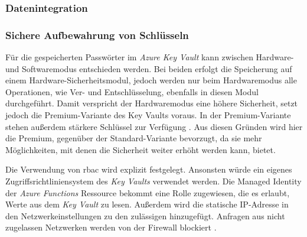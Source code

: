 \subsubsection{Datenintegration} \label{subsec:umsetzen:konfiguration:functions}

\subsubsection{Sichere Aufbewahrung von Schlüsseln} \label{subsec:umsetzen:konfiguration:keyVault}
Für die gespeicherten Passwörter im \textit{Azure Key Vault} kann zwischen Hardware- und Softwaremodus entschieden werden. Bei beiden erfolgt die Speicherung auf einem Hardware-Sicherheitsmodul, jedoch werden nur beim Hardwaremodus alle Operationen, wie Ver- und Entschlüsselung, ebenfalls in diesen Modul durchgeführt. Damit verspricht der Hardwaremodus eine höhere Sicherheit, setzt jedoch die Premium-Variante des Key Vaults voraus. In der Premium-Variante stehen außerdem stärkere Schlüssel zur Verfügung \cite{haunts_key_2019}. Aus diesen Gründen wird hier die Premium, gegenüber der Standard-Variante bevorzugt, da sie mehr Möglichkeiten, mit denen die Sicherheit weiter erhöht werden kann, bietet.

Die Verwendung von \ac{rbac} wird explizit festgelegt. Ansonsten würde ein eigenes Zugriffsrichtliniensystem des \textit{Key Vaults} verwendet werden. Die Managed Identity der \textit{Azure Functions} Ressource bekommt eine Rolle zugewiesen, die es erlaubt, Werte aus dem \textit{Key Vault} zu lesen. Außerdem wird die statische IP-Adresse in den Netzwerkeinstellungen zu den zulässigen hinzugefügt. Anfragen aus nicht zugelassen Netzwerken werden von der Firewall blockiert \cite[vgl.][]{herath_working_2022}.